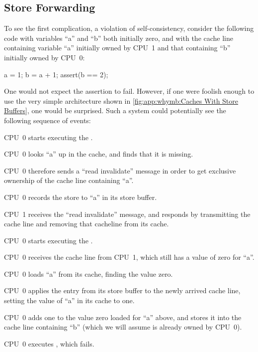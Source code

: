 \subsection{Store Forwarding}
\label{sec:app:whymb:Store Forwarding}

To see the first complication, a violation of self-consistency,
consider the following code with variables ``a'' and ``b'' both initially
zero, and with the cache line containing variable ``a'' initially
owned by CPU~1 and that containing ``b'' initially owned by CPU~0:

\begin{VerbatimN}[fontsize=\footnotesize,samepage=true]
a = 1;
b = a + 1;
assert(b == 2);
\end{VerbatimN}

One would not expect the assertion to fail.
However, if one were foolish enough to use the very simple architecture
shown in
\cref{fig:app:whymb:Caches With Store Buffers},
one would be surprised.
Such a system could potentially see the following sequence of events:
\begin{sequence}
\item	CPU~0 starts executing the .
\item	CPU~0 looks ``a'' up in the cache, and finds that it is missing.
\item	CPU~0 therefore sends a ``read invalidate'' message in order to
	get exclusive ownership of the cache line containing ``a''.
\item	CPU~0 records the store to ``a'' in its store buffer.
\item	CPU~1 receives the ``read invalidate'' message, and responds
	by transmitting the cache line and removing that cacheline from
	its cache.
\item	CPU~0 starts executing the .
\item	CPU~0 receives the cache line from CPU~1, which still has
	a value of zero for ``a''.
\item	CPU~0 loads ``a'' from its cache, finding the value zero.
	\label{item:app:whymb:Need Store Buffer}
\item	CPU~0 applies the entry from its store buffer to the newly
	arrived cache line, setting the value of ``a'' in its cache
	to one.
\item	CPU~0 adds one to the value zero loaded for ``a'' above,
	and stores it into the cache line containing ``b''
	(which we will assume is already owned by CPU~0).
\item	CPU~0 executes , which fails.
\end{sequence}

